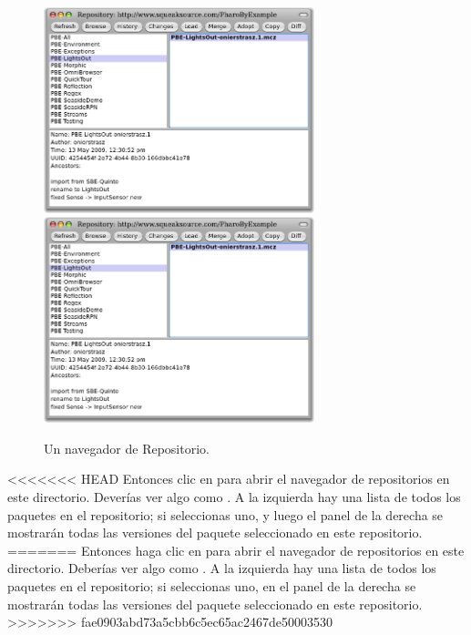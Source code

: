 \documentclass[spanish,a4paper,10pt,twoside]{book}
\begin{document}
\begin{figure}[btp]
	\begin{center}
	\ifluluelse
		{\includegraphics[width=0.7\textwidth]{SqueakSource-PBE}}
		{\includegraphics[width=0.7\textwidth]{SqueakSource-PBE}}
	\end{center}
	\caption{Un navegador de Repositorio.}
\end{figure}
\noindent
<<<<<<< HEAD
Entonces clic en  para abrir el navegador de repositorios en este directorio.  Dever\'ias ver algo como .  A la izquierda hay una lista de todos los paquetes en el repositorio; si seleccionas uno, y luego el panel de la derecha se mostrar\'an todas las versiones del paquete seleccionado en este repositorio.
=======
Entonces haga clic en  para abrir el navegador de repositorios en este directorio.  Deber\'ias ver algo como .  A la izquierda hay una lista de todos los paquetes en el repositorio; si seleccionas uno, en el panel de la derecha se mostrar\'an todas las versiones del paquete seleccionado en este repositorio.
>>>>>>> fae0903abd73a5cbb6c5ec65ac2467de50003530
\end{document}
